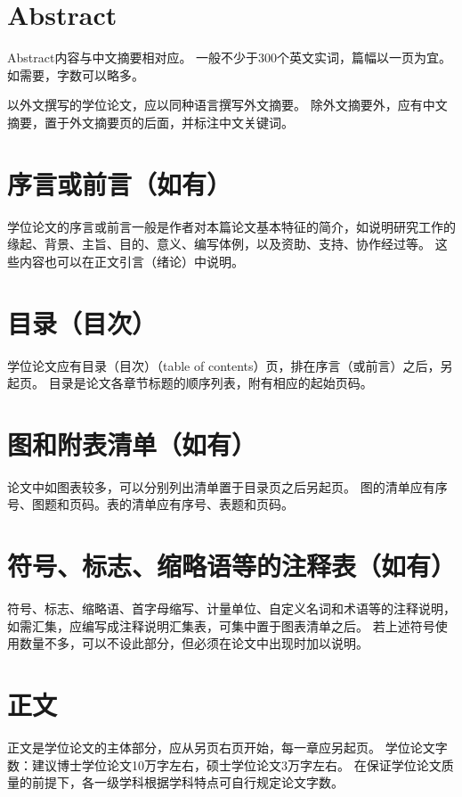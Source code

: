 \section{Abstract}

Abstract内容与中文摘要相对应。
一般不少于300个英文实词，篇幅以一页为宜。
如需要，字数可以略多。

以外文撰写的学位论文，应以同种语言撰写外文摘要。
除外文摘要外，应有中文摘要，置于外文摘要页的后面，并标注中文关键词。

\section{序言或前言（如有）}

学位论文的序言或前言一般是作者对本篇论文基本特征的简介，如说明研究工作的缘起、背景、主旨、目的、意义、编写体例，以及资助、支持、协作经过等。
这些内容也可以在正文引言（绪论）中说明。

\section{目录（目次）}

学位论文应有目录（目次）（table of contents）页，排在序言（或前言）之后，另起页。
目录是论文各章节标题的顺序列表，附有相应的起始页码。

\section{图和附表清单（如有）}

论文中如图表较多，可以分别列出清单置于目录页之后另起页。
图的清单应有序号、图题和页码。表的清单应有序号、表题和页码。

\section{符号、标志、缩略语等的注释表（如有）}

符号、标志、缩略语、首字母缩写、计量单位、自定义名词和术语等的注释说明，如需汇集，应编写成注释说明汇集表，可集中置于图表清单之后。
若上述符号使用数量不多，可以不设此部分，但必须在论文中出现时加以说明。

\section{正文}

正文是学位论文的主体部分，应从另页右页开始，每一章应另起页。
学位论文字数：建议博士学位论文10万字左右，硕士学位论文3万字左右。
在保证学位论文质量的前提下，各一级学科根据学科特点可自行规定论文字数。

